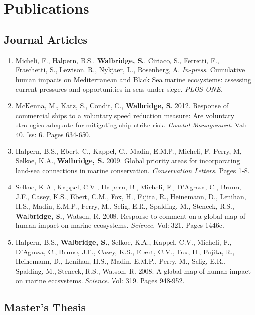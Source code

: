 \documentclass[letterpaper]{article}
\begin{document}
\section*{Publications}

\subsection*{Journal Articles}

\begin{enumerate}

\item Micheli, F., Halpern, B.S., {\bf Walbridge, S.}, Ciriaco, S., Ferretti, F., Fraschetti, S., Lewison, R., Nykjaer, L., Rosenberg, A. {\it In-press}. Cumulative human impacts on Mediterranean and Black Sea marine ecosystems: assessing current pressures and opportunities in seas under siege. {\it PLOS ONE}.
\item McKenna, M., Katz, S., Condit, C., {\bf Walbridge, S.} 2012. Response of commercial ships to a voluntary speed reduction measure: Are voluntary strategies adequate for mitigating ship strike risk. {\it Coastal Management}. Val: 40. Iss: 6. Pages 634-650.
\item Halpern, B.S., Ebert, C., Kappel, C., Madin, E.M.P., Micheli, F, Perry, M, Selkoe, K.A., {\bf Walbridge, S.} 2009. Global priority areas for incorporating land-sea connections in marine conservation. {\it Conservation Letters}. Pages 1-8.
\item Selkoe, K.A., Kappel, C.V., Halpern, B., Micheli, F., D'Agrosa, C., Bruno, J.F., Casey, K.S., Ebert, C.M., Fox, H., Fujita, R., Heinemann, D., Lenihan, H.S., Madin, E.M.P., Perry, M., Selig, E.R., Spalding, M., Steneck, R.S., {\bf Walbridge, S.}, Watson, R. 2008. Response to comment on a global map of human impact on marine ecosystems. {\it Science}. Vol: 321. Pages 1446c.
\item Halpern, B.S., {\bf Walbridge, S.}, Selkoe, K.A., Kappel, C.V., Micheli, F., D'Agrosa, C., Bruno, J.F., Casey, K.S., Ebert, C.M., Fox, H., Fujita, R., Heinemann, D., Lenihan, H.S., Madin, E.M.P., Perry, M., Selig, E.R., Spalding, M., Steneck, R.S., Watson, R. 2008. A global map of human impact on marine ecosystems. {\it Science}. Vol: 319. Pages 948-952.
\end{enumerate}

\subsection*{Master's Thesis}
\end{document}
